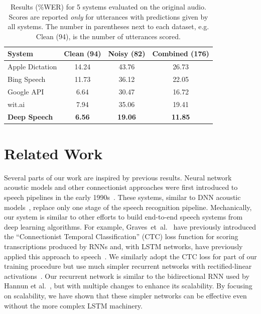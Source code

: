 \documentclass{article}
\begin{document}
\begin{table}[ht!]
\centering
\begin{tabular}{l  c  c  c}
\toprule
System      &  Clean (94) &  Noisy (82) & Combined (176) \\
\midrule
Apple Dictation  & 14.24   & 43.76  & 26.73 \\
Bing Speech      &  11.73     &   36.12   &  22.05   \\
Google API       &  6.64   & 30.47  & 16.72 \\
wit.ai           &  7.94   & 35.06  & 19.41 \\
{\bf Deep Speech}       &  {\bf 6.56}   & {\bf 19.06}  & {\bf 11.85} \\
\bottomrule
\end{tabular}
\caption{Results (\%WER) for 5 systems evaluated on the original audio. Scores are reported {\it only} for utterances with predictions given by all systems. The number in parentheses next to each dataset, e.g. Clean (94), is the number of utterances scored.}
\label{table:originalaudio}
\end{table}


\section{Related Work}
\label{section:related}

Several parts of our work are inspired by previous results. Neural network
acoustic models and other connectionist approaches were first introduced to
speech pipelines in the early 1990s~\cite{Bourlard93, Renals1994, Ellis1999}.
These systems, similar to DNN acoustic
models~\cite{Mohamed2011,Hinton2012,Dahl2011a}, replace only one stage of the
speech recognition pipeline.  Mechanically, our system is similar to other
efforts to build end-to-end speech systems from deep learning algorithms.  For
example, Graves~et~al.~\cite{Graves2006} have previously introduced the
``Connectionist Temporal Classification'' (CTC) loss function for scoring
transcriptions produced by RNNs and, with LSTM networks, have previously
applied this approach to speech~\cite{Graves2014}.  We similarly adopt the CTC
loss for part of our training procedure but use much simpler recurrent networks
with rectified-linear
activations~\cite{glorot2011deep,Maas2013,nair2010relurbm}.   Our recurrent
network is similar to the bidirectional RNN used by Hannun et
al.~\cite{hannun2014firstpass}, but with multiple changes to enhance its
scalability. By focusing on scalability, we have shown that these simpler
networks can be effective even without the more complex LSTM machinery.
\end{document}

